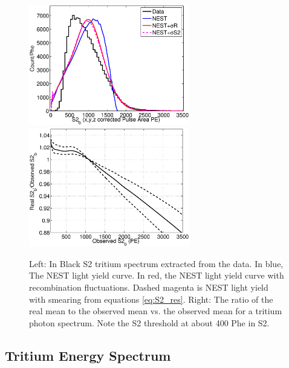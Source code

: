  \begin{figure}[h!]\centering
\includegraphics[width=70mm]{Recombination_LY_QY/Figures/S1S2_Spectra/S2_spec_.eps}
\includegraphics[width=70mm]{Recombination_LY_QY/Figures/S1S2_Spectra/S2_corr_.eps}
\caption{Left: In Black S2 tritium spectrum extracted from the data. In blue, The NEST light yield curve. In red, the NEST light yield curve with recombination fluctuations. Dashed magenta is NEST light yield with smearing from equations \ref{eq:S2_res}.  Right: The ratio of the real mean to the observed mean vs. the observed mean for a tritium photon spectrum. Note the S2 threshold at about 400 Phe in S2. }
\label{fig:S2_mapping}
\end{figure}


\subsection{Tritium Energy Spectrum}

